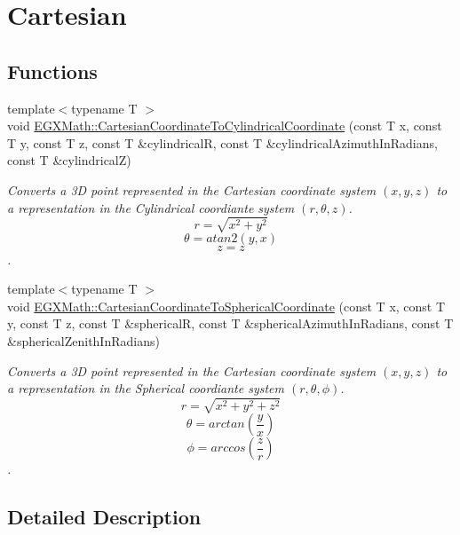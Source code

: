 \hypertarget{group___e_g_x_math-_conversions-_coordinate_conversions-3_d-_cartesian}{}\section{Cartesian}
\label{group___e_g_x_math-_conversions-_coordinate_conversions-3_d-_cartesian}
\subsection*{Functions}
\begin{DoxyCompactItemize}
\item 
{\footnotesize template$<$typename T $>$ }\\void \mbox{\hyperlink{group___e_g_x_math-_conversions-_coordinate_conversions-3_d-_cartesian_ga256f37d22da9bb58db556ee40dac8d81}{E\+G\+X\+Math\+::\+Cartesian\+Coordinate\+To\+Cylindrical\+Coordinate}} (const T x, const T y, const T z, const T \&cylindricalR, const T \&cylindrical\+Azimuth\+In\+Radians, const T \&cylindricalZ)
\begin{DoxyCompactList}\small\item\em Converts a 3D point represented in the Cartesian coordinate system $(x,y,z)$ to a representation in the Cylindrical coordiante system $(r,\theta,z)$. \[ r = \sqrt{x^2+y^2} \] \[ \theta = atan2(y,x) \] \[ z = z \]. \end{DoxyCompactList}\item 
{\footnotesize template$<$typename T $>$ }\\void \mbox{\hyperlink{group___e_g_x_math-_conversions-_coordinate_conversions-3_d-_cartesian_ga849c93ec135e9c72c5320c48eeacc7c9}{E\+G\+X\+Math\+::\+Cartesian\+Coordinate\+To\+Spherical\+Coordinate}} (const T x, const T y, const T z, const T \&sphericalR, const T \&spherical\+Azimuth\+In\+Radians, const T \&spherical\+Zenith\+In\+Radians)
\begin{DoxyCompactList}\small\item\em Converts a 3D point represented in the Cartesian coordinate system $(x,y,z)$ to a representation in the Spherical coordiante system $(r,\theta,\phi)$. \[ r = \sqrt{x^2+y^2+z^2} \] \[ \theta = arctan(\frac{y}{x}) \] \[ \phi = arccos(\frac{z}{r}) \]. \end{DoxyCompactList}\end{DoxyCompactItemize}


\subsection{Detailed Description}


